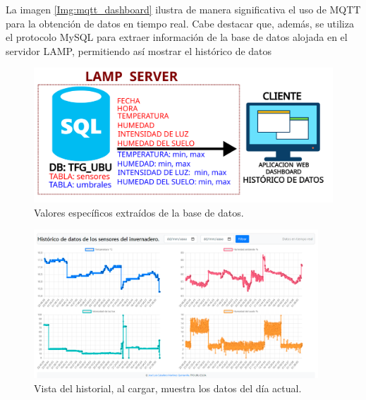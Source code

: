 La imagen \ref{Img:mqtt_dashboard} ilustra de manera significativa el uso de MQTT para la obtención de datos en tiempo real. Cabe destacar que, además, se utiliza el protocolo MySQL para extraer información de la base de datos alojada en el servidor LAMP, permitiendo así mostrar el histórico de datos

\begin{figure}[h]
    \centering
    \includegraphics[width=1\textwidth]{img/diagramas/mqtt_dashboard_Historico.png}
    \caption{Valores específicos extraídos de la base de datos.} \label{Img:Dashboard_diagrama_Historico}
\end{figure}

\begin{figure}[h]
    \centering
    \includegraphics[width=0.95\textwidth]{img/desarrollo/Dashboard_Historico.png}
    \caption{Vista del historial, al cargar, muestra los datos del día actual.} \label{Img:Dashboard_Historico}
\end{figure}



